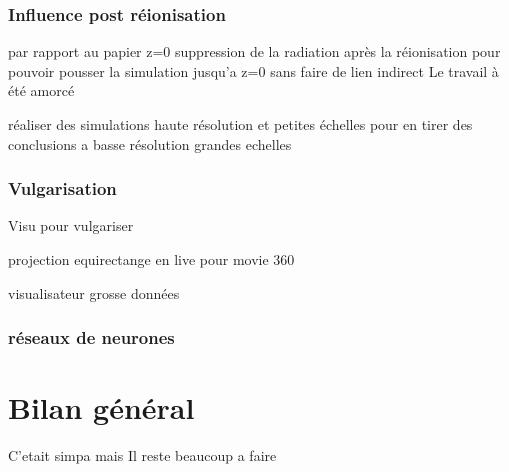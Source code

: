 \subsection{Influence post réionisation}
par  rapport au papier z=0
suppression de la radiation après la réionisation pour pouvoir pousser la simulation jusqu'a z=0 sans faire de lien indirect
Le travail à été amorcé

réaliser des simulations haute résolution et petites échelles pour en tirer des conclusions a basse résolution grandes echelles

\subsection{Vulgarisation}
Visu pour vulgariser

projection equirectange en live pour movie 360

visualisateur grosse données

\subsection{réseaux de neurones}





\chapter{Bilan général}

C'etait simpa mais 
Il reste beaucoup a faire